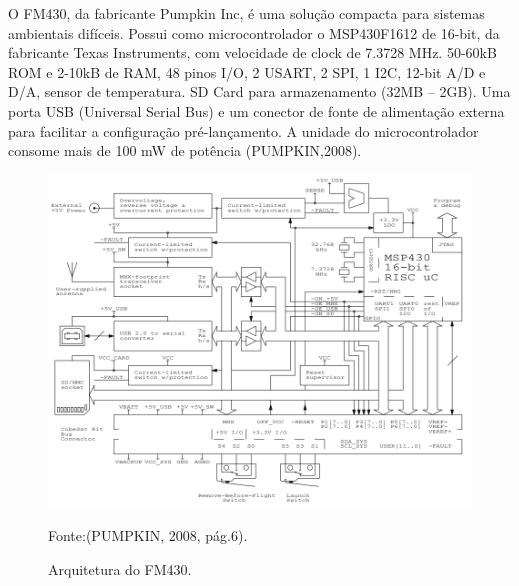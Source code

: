 \begin{itemize}
O FM430, da fabricante Pumpkin Inc, é uma solução compacta para sistemas ambientais difíceis. Possui como microcontrolador o MSP430F1612 de 16-bit, da fabricante Texas Instruments, com velocidade de clock de 7.3728 MHz. 50-60kB ROM e 2-10kB de RAM, 48 pinos I/O, 2 USART, 2 SPI, 1 I2C, 12-bit A/D e D/A, sensor de temperatura. SD Card para armazenamento (32MB – 2GB). Uma porta USB (Universal Serial Bus) e um conector de fonte de alimentação externa para facilitar a configuração pré-lançamento. A unidade do microcontrolador consome mais de 100 mW de potência (PUMPKIN,2008).

\begin{figure}[h]
	\centering
	\caption{Arquitetura do FM430.}
	
\includegraphics[keepaspectratio=true,scale=0.55]{figuras/fm430.PNG}
	
	Fonte:(PUMPKIN, 2008, pág.6).\linebreak
	\label{fig15}
\end{figure}

\end{itemize}

